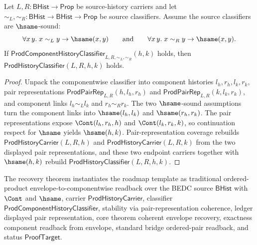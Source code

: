 \begin{theorem}
\label{thm:prod-component-history-classifier-descends-to-envelope}
Let $L,R:\mathsf{BHist}\to\mathsf{Prop}$ be source-history carriers and let
$\sim_L,\sim_R:\mathsf{BHist}\to\mathsf{BHist}\to\mathsf{Prop}$ be source
classifiers. Assume the source classifiers are $\hsame$-sound:
$$
\forall x\,y.\;x\sim_L y\to\hsame(x,y)
\qquad\hbox{and}\qquad
\forall x\,y.\;x\sim_R y\to\hsame(x,y).
$$
If $\mathsf{ProdComponentHistoryClassifier}_{L,R,\sim_L,\sim_R}(h,k)$ holds,
then $\mathsf{ProdHistoryClassifier}(L,R,h,k)$ holds.
\end{theorem}
\begin{proof}
Unpack the componentwise classifier into component histories
$l_h,r_h,l_k,r_k$, pair representations
$\mathsf{ProdPairRep}_{L,R}(h,l_h,r_h)$ and
$\mathsf{ProdPairRep}_{L,R}(k,l_k,r_k)$, and component links
$l_h\sim_L l_k$ and $r_h\sim_R r_k$. The two $\hsame$-sound assumptions turn
the component links into $\hsame(l_h,l_k)$ and $\hsame(r_h,r_k)$. The pair
representations expose $\Cont(l_h,r_h,h)$ and $\Cont(l_k,r_k,k)$, so
continuation respect for $\hsame$ yields $\hsame(h,k)$. Pair-representation
coverage rebuilds $\mathsf{ProdHistoryCarrier}(L,R,h)$ and
$\mathsf{ProdHistoryCarrier}(L,R,k)$ from the two displayed pair
representations, and these two endpoint carriers together with
$\hsame(h,k)$ rebuild $\mathsf{ProdHistoryClassifier}(L,R,h,k)$.
\end{proof}

The recovery theorem instantiates the roadmap template as traditional ordered-product envelope-to-componentwise readback over the BEDC source $\mathsf{BHist}$ with $\Cont$ and $\hsame$, carrier $\mathsf{ProdHistoryCarrier}$, classifier $\mathsf{ProdComponentHistoryClassifier}$, stability via pair-representation coherence, ledger displayed pair representation, core theorem coherent envelope recovery, exactness component readback from envelope, standard bridge ordered-pair readback, and status $\mathsf{ProofTarget}$.

